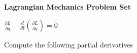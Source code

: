 \documentclass{exam}
\begin{document}
    \vspace*{-25px}
    \begin{center}
        \huge \textbf{Lagrangian Mechanics Problem Set}
    \end{center}
    \vspace*{0.05in}
    \Huge
    \begin{center}
        $\frac{\partial L}{\partial q}-\frac{d}{dt}(\frac{\partial L}{\partial \dot{q}})=0$
    \end{center}
    \begin{questions}
        \large
        \question Compute the following partial derivatives
\end{questions}
\end{document}
